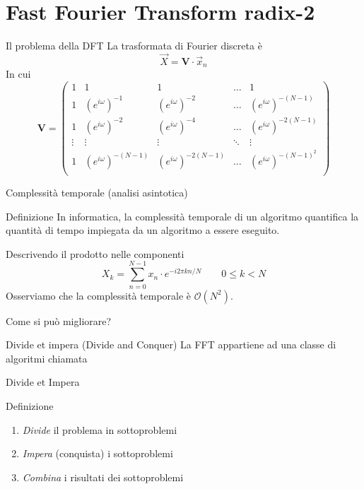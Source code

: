 \documentclass[10pt, xetex]{beamer}
\begin{document}
\section{Fast Fourier Transform {\small radix-2}}
\begin{frame}{Il problema della DFT}
    La trasformata di Fourier discreta \`e
    \[
        \vec{X} = \mathbf{V}\cdot\vec{x}_n
    \]
    In cui
    \[
        \mathbf{V} = 
        \begin{pmatrix}
        1      & 1                      & 1                       & \dots  & 1                        \\[1em]
        1      & (e^{i\omega})^{-1}     & (e^{i\omega})^{-2}      & \dots  & (e^{i\omega})^{-(N-1)}   \\[1em]
        1      & (e^{i\omega})^{-2}     & (e^{i\omega})^{-4}      & \dots  & (e^{i\omega})^{-2(N-1)}  \\[1em]
        \vdots & \vdots                 &  \vdots                 & \ddots & \vdots                   \\[1em]
        1      & (e^{i\omega})^{-(N-1)} & (e^{i\omega})^{-2(N-1)} & \dots  & (e^{i\omega})^{-(N-1)^2} \\[1em]
        \end{pmatrix}
    \]
\end{frame}

\begin{frame}{Complessit\`a temporale (analisi asintotica)}
    \begin{block}{Definizione}
        In informatica, la complessità temporale di un algoritmo quantifica la
        quantità di tempo impiegata da un algoritmo a essere eseguito.
    \end{block}

    \pause
    Descrivendo il prodotto nelle componenti
    \[
        X_k = \sum_{n=0}^{N-1} x_n\cdot e^{-i2\pi kn/N}
        \qquad 0 \leq k < N
    \]
    Osserviamo che la complessit\`a temporale \`e \(\mathcal{O}(N^2)\).

    \pause
    \begin{center}
        \Large Come si pu\`o migliorare?
    \end{center}
\end{frame}

\begin{frame}{Divide et impera (Divide and Conquer)}
    La FFT appartiene ad una classe di algoritmi chiamata
    \begin{center}
        \Large Divide et Impera
    \end{center}

    \begin{block}{Definizione}
    \begin{enumerate}
        \item \emph{Divide} il problema in sottoproblemi
        \item \emph{Impera} (conquista) i sottoproblemi
        \item \emph{Combina} i risultati dei sottoproblemi
    \end{enumerate}
    \end{block}
\end{frame}
\end{document}
